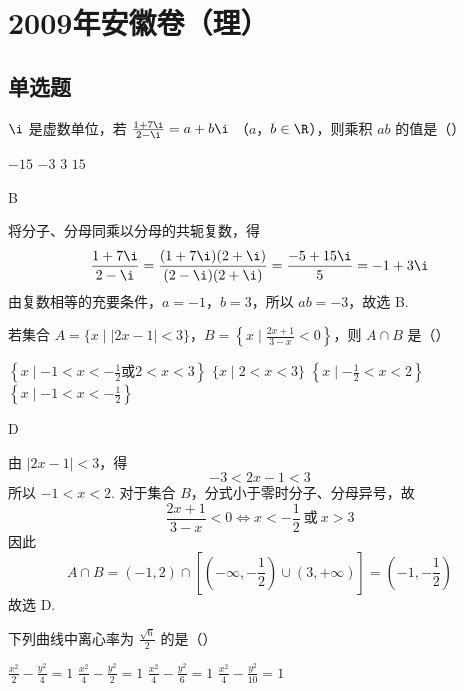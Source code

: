 \chapter{2009年安徽卷（理）}

\section{单选题}

\begin{problem}
\(\i\) 是虚数单位，若 \(\frac{1 + 7\i}{2 - \i} = a + b\i\) （\(a\)，\(b\in\R\)），则乘积 \(ab\) 的值是（\quad）

\choices
    {\(-15\)}
    {\(-3\)}
    {\(3\)}
    {\(15\)}
\end{problem}

\begin{answer}
B
\end{answer}

\begin{solution}
将分子、分母同乘以分母的共轭复数，得
\[
\frac{1+7\i}{2-\i}=\frac{(1+7\i)(2+\i)}{(2-\i)(2+\i)}=\frac{-5+15\i}{5}=-1+3\i
\]
由复数相等的充要条件，\(a=-1\)，\(b=3\)，所以 \(ab=-3\)，故选 B.
\end{solution}

\begin{problem}
若集合 \(A = \{x \mid |2x - 1| < 3\}\)，\(B = \left\{x \mid \frac{2x + 1}{3 - x} < 0\right\}\)，则 \(A \cap B\) 是（\quad）

\choices
    {\(\left\{x\mid -1 < x < -\frac{1}{2}\text{或} 2 < x < 3\right\}\)}
    {\(\{x\mid 2 < x < 3\}\)}
    {\(\left\{x\mid -\frac{1}{2} < x < 2\right\}\)}
    {\(\left\{x\mid -1 < x < -\frac{1}{2}\right\}\)}
\end{problem}

\begin{answer}
D
\end{answer}

\begin{solution}
由 \(|2x-1|<3\)，得
\[
-3<2x-1<3
\]
所以 \(-1<x<2\). 对于集合 \(B\)，分式小于零时分子、分母异号，故
\[
\frac{2x+1}{3-x}<0
\Longleftrightarrow x<-\frac{1}{2}\ \text{或}\ x>3
\]
因此
\[
A\cap B=(-1,2)\cap\left[\left(-\infty,-\frac{1}{2}\right)\cup(3,+\infty)\right]
=\left(-1,-\frac{1}{2}\right)
\]
故选 D.
\end{solution}

\begin{problem}
下列曲线中离心率为 \(\frac{\sqrt{6}}{2}\) 的是（\quad）

\choices
    {\(\frac{x^2}{2} - \frac{y^2}{4} = 1\)}
    {\(\frac{x^2}{4} - \frac{y^2}{2} = 1\)}
    {\(\frac{x^2}{4} - \frac{y^2}{6} = 1\)}
    {\(\frac{x^2}{4} - \frac{y^2}{10} = 1\)}
\end{problem}

